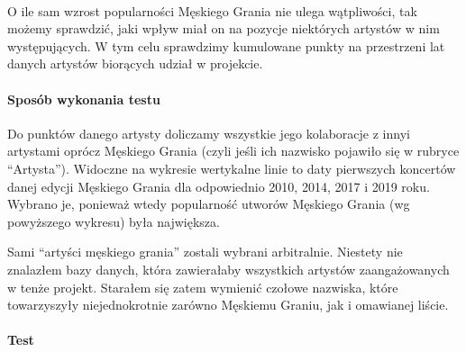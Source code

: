 \documentclass[11pt]{article}
\begin{document}
    
    \begin{center}
    \end{center}
    { \hspace*{\fill} \\}
    
    O ile sam wzrost popularności Męskiego Grania nie ulega wątpliwości, tak
możemy sprawdzić, jaki wpływ miał on na pozycje niektórych artystów w
nim występujących. W tym celu sprawdzimy kumulowane punkty na
przestrzeni lat danych artystów biorących udział w projekcie.

\hypertarget{sposuxf3b-wykonania-testu}{%
\paragraph{Sposób wykonania testu}\label{sposuxf3b-wykonania-testu}}

Do punktów danego artysty doliczamy wszystkie jego kolaboracje z innyi
artystami oprócz Męskiego Grania (czyli jeśli ich nazwisko pojawiło się
w rubryce ``Artysta''). Widoczne na wykresie wertykalne linie to daty
pierwszych koncertów danej edycji Męskiego Grania dla odpowiednio 2010,
2014, 2017 i 2019 roku. Wybrano je, ponieważ wtedy popularność utworów
Męskiego Grania (wg powyższego wykresu) była największa.

Sami ``artyści męskiego grania'' zostali wybrani arbitralnie. Niestety
nie znalazłem bazy danych, która zawierałaby wszystkich artystów
zaangażowanych w tenże projekt. Starałem się zatem wymienić czołowe
nazwiska, które towarzyszyły niejednokrotnie zarówno Męskiemu Graniu,
jak i omawianej liście.

\hypertarget{test}{%
\paragraph{Test}\label{test}}
\end{document}
